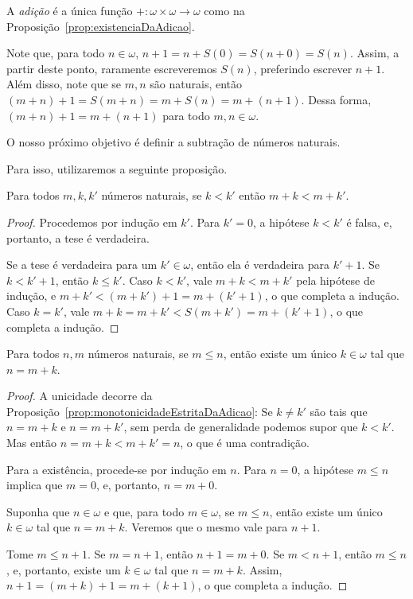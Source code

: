 \begin{definition}[$Z^-$]\label{def:adicao}
    A \emph{adição} é a única função $+: \omega\times \omega\to \omega$ como na Proposição~\ref{prop:existenciaDaAdicao}.
\end{definition}

Note que, para todo $n \in \omega$, $n+1=n+S(0)=S(n+0)=S(n)$.
Assim, a partir deste ponto, raramente escreveremos $S(n)$, preferindo escrever $n+1$.
Além disso, note que se $m, n$ são naturais, então $(m+n)+1=S(m+n)=m+S(n)=m+(n+1)$.
Dessa forma, $(m+n)+1=m+(n+1)$ para todo $m, n \in \omega$.

O nosso próximo objetivo é definir a subtração de números naturais.

Para isso, utilizaremos a seguinte proposição.
\begin{proposition}[$Z^-$]\label{prop:monotonicidadeEstritaDaAdicao}
    Para todos $m, k, k'$ números naturais, se $k<k'$ então $m+k<m+k'$.
\end{proposition}
\begin{proof}
    Procedemos por indução em $k'$.
    Para $k'=0$, a hipótese $k<k'$ é falsa, e, portanto, a tese é verdadeira.

    Se a tese é verdadeira para um $k' \in \omega$, então ela é verdadeira para $k'+1$.
    Se $k<k'+1$, então $k\leq k'$.
    Caso $k<k'$, vale $m+k<m+k'$ pela hipótese de indução, e $m+k'<(m+k')+1=m+(k'+1)$, o que completa a indução.
    Caso $k=k'$, vale $m+k=m+k'<S(m+k')=m+(k'+1)$, o que completa a indução.
\end{proof}

\begin{proposition}[$Z^-$]\label{prop:existenciaDaDiferencaNosNaturais}
    Para todos $n, m$ números naturais, se $m\leq n$, então existe um único $k \in \omega$ tal que $n=m+k$.
\end{proposition}
\begin{proof}
    A unicidade decorre da Proposição~\ref{prop:monotonicidadeEstritaDaAdicao}:
    Se $k\neq k'$ são tais que $n=m+k$ e $n=m+k'$, sem perda de generalidade podemos supor que $k<k'$.
    Mas então $n=m+k<m+k'=n$, o que é uma contradição.

    Para a existência, procede-se por indução em $n$.
    Para $n=0$, a hipótese $m\leq n$ implica que $m=0$, e, portanto, $n=m+0$.

    Suponha que $n\in \omega$ e que, para todo $m\in \omega$, se $m\leq n$, então existe um único $k \in \omega$ tal que $n=m+k$.
    Veremos que o mesmo vale para $n+1$.

    Tome $m \leq n+1$.
    Se $m=n+1$, então $n+1=m+0$.
    Se $m<n+1$, então $m\leq n$, e, portanto, existe um $k\in \omega$ tal que $n=m+k$.
    Assim, $n+1=(m+k)+1=m+(k+1)$, o que completa a indução.
\end{proof}

